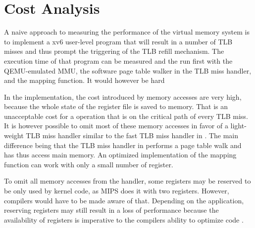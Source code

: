 


\section{Cost Analysis}

A naive approach to measuring the performance of the virtual memory system is to implement a xv6 user-level program that will result in a number of TLB misses and thus prompt the triggering of the TLB refill mechanism. The execution time of that program can be measured and the run first with the QEMU-emulated MMU, the software page table walker in the TLB miss handler, and the mapping function.
It would however be hard %

In the implementation, the cost introduced by memory accesses are very high, because the whole state of the register file is saved to memory. That is an unacceptable cost for a operation that is on the critical path of every TLB miss. It is however possible to omit most of these memory accesses in favor of a light-weight TLB miss handler similar to the fast TLB miss handler in \cite{heiserAnatomyHighPerformanceMicrokernel}. The main difference being that the TLB miss handler in \cite{heiserAnatomyHighPerformanceMicrokernel} performs a page table walk and has thus access main memory. An optimized implementation of the mapping function can work with only a small number of register.

To omit all memory accesses from the handler, some registers may be reserved to be only used by kernel code, as MIPS does it with two registers. However, compilers would have to be made aware of that. Depending on the application, reserving registers may still result in a loss of performance because the availability of registers is imperative to the compilers ability to optimize code \cite{elphinstone2013l3}.

